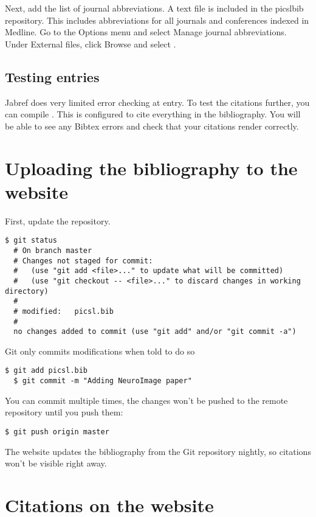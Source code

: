 \documentclass{InsightArticle}
\begin{document}
Next, add the list of journal abbreviations. A text file  is included in the picslbib repository. This includes abbreviations for all journals and conferences indexed in Medline. Go to the Options menu and select Manage journal abbreviations. Under External files, click Browse and select .

\subsection{Testing entries}

Jabref does very limited error checking at entry. To test the citations further, you can compile . This is configured to cite everything in the bibliography. You will be able to see any Bibtex errors and check that your citations render correctly.


\section{Uploading the bibliography to the website}

First, update the repository.

\begin{lstlisting}[style=bash]
  $ git status
  # On branch master
  # Changes not staged for commit:
  #   (use "git add <file>..." to update what will be committed)
  #   (use "git checkout -- <file>..." to discard changes in working directory)
  #
  #	modified:   picsl.bib
  #
  no changes added to commit (use "git add" and/or "git commit -a")
\end{lstlisting}

Git only commits modifications when told to do so
\begin{lstlisting}[style=bash]
  $ git add picsl.bib
  $ git commit -m "Adding NeuroImage paper" 
\end{lstlisting}

You can commit multiple times, the changes won't be pushed to the remote repository until you push them:
\begin{lstlisting}[style=bash]
  $ git push origin master 
\end{lstlisting}

The website updates the bibliography from the Git repository nightly, so citations won't be visible right away.


\section{Citations on the website}
\end{document}
